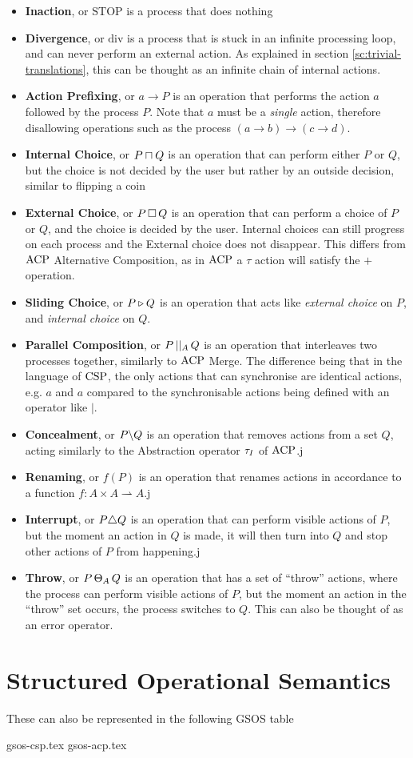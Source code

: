 \documentclass[../hons_project.tex]{subfiles}
\begin{document}
\begin{itemize}
    \item \textbf{Inaction}, or $\mathrm{STOP}$ is a process that does nothing
    \item \textbf{Divergence}, or $\mathrm{div}$ is a process that is stuck in an infinite processing loop, and can never perform an external action. As explained in section \ref{sc:trivial-translations}, this can be thought as an infinite chain of internal actions.
    \item \textbf{Action Prefixing}, or $a \to P$ is an operation that performs the action $a$ followed by the process $P$. Note that $a$ must be a \textit{single} action, therefore disallowing operations such as the process $(a \to b) \to (c \to d)$.
    \item \textbf{Internal Choice}, or $P \sqcap Q$ is an operation that can perform either $P$ or $Q$, but the choice is not decided by the user but rather by an outside decision, similar to flipping a coin
    \item \textbf{External Choice}, or $P \,\square\, Q$ is an operation that can perform a choice of $P$ or $Q$, and the choice is decided by the user. Internal choices can still progress on each process and the External choice does not disappear. This differs from $\mathrm{ACP}$ Alternative Composition, as in $\mathrm{ACP}$ a $\tau$ action will satisfy the $+$ operation.
    \item \textbf{Sliding Choice}, or $P \triangleright Q$ is an operation that acts like \textit{external choice} on $P$, and \textit{internal choice} on $Q$.
    \item \textbf{Parallel Composition}, or $P \,\vert\vert_{A}\, Q$ is an operation that interleaves two processes together, similarly to $\mathrm{ACP}$ Merge. The difference being that in the language of $\mathrm{CSP}$, the only actions that can synchronise are identical actions, e.g. $a$ and $a$ compared to the synchronisable actions being defined with an operator like $\mid$.
    \item \textbf{Concealment}, or $P \backslash Q$ is an operation that removes actions from a set $Q$, acting similarly to the Abstraction operator $\tau_{I}$ of $\mathrm{ACP}$.j
    \item \textbf{Renaming}, or $f(P)$ is an operation that renames actions in accordance to a function $f : A \times A \rightharpoonup A$.j
    \item \textbf{Interrupt}, or $P \triangle Q$ is an operation that can perform visible actions of $P$, but the moment an action in $Q$ is made, it will then turn into $Q$ and stop other actions of $P$ from happening.j
    \item \textbf{Throw}, or $P \,\Theta_{A}\, Q$ is an operation that has a set of ``throw'' actions, where the process can perform visible actions of $P$, but the moment an action in the ``throw'' set occurs, the process switches to $Q$. This can also be thought of as an error operator.
\end{itemize}

\section{Structured Operational Semantics}

These can also be represented in the following GSOS table

{gsos-csp.tex}
{gsos-acp.tex}
\end{document}
